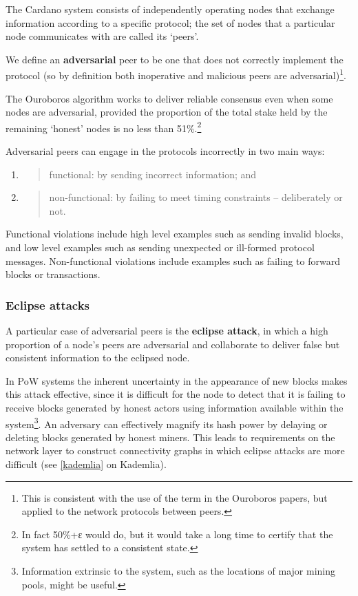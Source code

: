 \documentclass[11pt,a4paper]{article}
\begin{document}
The Cardano system consists of independently operating nodes that
exchange information according to a specific protocol; the set of nodes
that a particular node communicates with are called its `peers'.

We define an \textbf{adversarial} peer to be one that does not correctly
implement the protocol (so by definition both inoperative and malicious
peers are adversarial)\footnote{This is consistent with the use of the
  term in the Ouroboros papers, but applied to the network protocols
  between peers.}.

The Ouroboros algorithm works to deliver reliable consensus even when
some nodes are adversarial, provided the proportion of the total stake
held by the remaining `honest' nodes is no less than 51\%.\footnote{In
  fact 50\%+ε would do, but it would take a long time to certify that
  the system has settled to a consistent state.}

Adversarial peers can engage in the protocols incorrectly in two main
ways:

\begin{enumerate}
\def\labelenumi{\arabic{enumi}.}
\item
  \begin{quote}
  functional: by sending incorrect information; and
  \end{quote}
\item
  \begin{quote}
  non-functional: by failing to meet timing constraints -- deliberately
  or not.
  \end{quote}
\end{enumerate}

Functional violations include high level examples such as sending
invalid blocks, and low level examples such as sending unexpected or
ill-formed protocol messages. Non-functional violations include examples
such as failing to forward blocks or transactions.

\subsubsection{Eclipse attacks}
\label{eclipse-attacks}

A particular case of adversarial peers is the \textbf{eclipse attack},
in which a high proportion of a node's peers are adversarial and
collaborate to deliver false but consistent information to the eclipsed
node.

In PoW systems the inherent uncertainty in the appearance of new blocks
makes this attack effective, since it is difficult for the node to
detect that it is failing to receive blocks generated by honest actors
using information available within the system\footnote{Information
  extrinsic to the system, such as the locations of major mining pools,
  might be useful.}. An adversary can effectively magnify its hash power
by delaying or deleting blocks generated by honest miners. This leads to
requirements on the network layer to construct connectivity graphs in
which eclipse attacks are more difficult (see
\cref{kademlia} on Kademlia).
\end{document}
